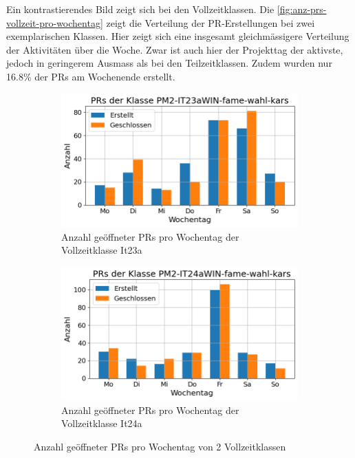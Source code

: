 Ein kontrastierendes Bild zeigt sich bei den Vollzeitklassen. Die \autoref{fig:anz-prs-vollzeit-pro-wochentag} zeigt die Verteilung der PR-Erstellungen bei zwei exemplarischen Klassen. 
Hier zeigt sich eine insgesamt gleichmässigere Verteilung der Aktivitäten über die Woche. Zwar ist auch hier der Projekttag der aktivste, jedoch in geringerem Ausmass als bei den Teilzeitklassen. Zudem wurden nur 16.8\% der PRs am Wochenende erstellt.

\begin{figure}[htbp]
    \centering
    \begin{subfigure}[b]{0.48\textwidth}
        \centering
        \includegraphics[width=\textwidth]{Figures/pr-klasse-per-wochentag-23a.png}
         \caption{Anzahl geöffneter PRs pro Wochentag der Vollzeitklasse It23a}
        \label{fig:anzahl-prs-pro-wochentag-it23a}
    \end{subfigure}
    \hfill
    \begin{subfigure}[b]{0.48\textwidth}
        \centering
        \includegraphics[width=\textwidth]{Figures/pr-klasse-per-wochentag-24a.png}
         \caption{Anzahl geöffneter PRs pro Wochentag der Vollzeitklasse It24a}
        \label{fig:anzahl-prs-pro-wochentag-it24a}
    \end{subfigure}
    \caption{Anzahl geöffneter PRs pro Wochentag von 2 Vollzeitklassen}
    \label{fig:anz-prs-vollzeit-pro-wochentag}
\end{figure}

